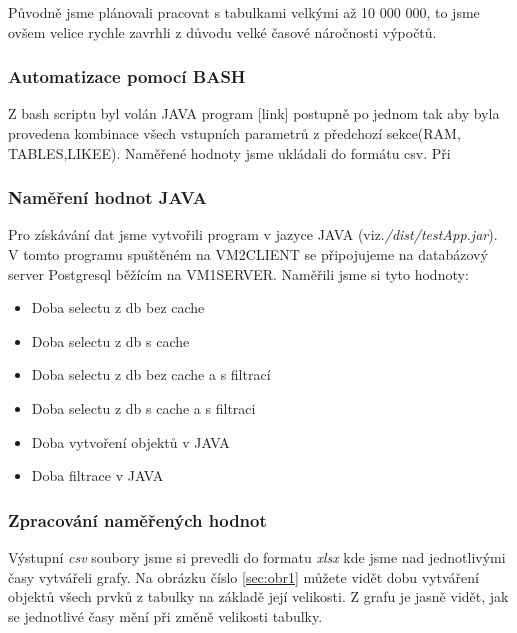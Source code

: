 \documentclass[a4paper, 11pt]{article}
\begin{document}
Původně jsme plánovali pracovat s tabulkami velkými až 10 000 000, to jsme ovšem velice rychle zavrhli z důvodu velké časové náročnosti výpočtů.

\subsubsection{Automatizace pomocí BASH}
Z bash scriptu byl volán JAVA program [link] postupně po jednom tak aby byla provedena kombinace všech vstupních parametrů z předchozí sekce(RAM, TABLES,LIKEE). Naměřené hodnoty jsme ukládali do formátu csv. Při 
\subsubsection{Naměření hodnot JAVA}
Pro získávání dat jsme vytvořili program v jazyce JAVA (viz.\textit{/dist/testApp.jar}). V tomto programu spuštěném na VM2CLIENT se připojujeme na databázový server Postgresql běžícím na VM1SERVER. Naměřili jsme si tyto hodnoty:

\begin{itemize}
\item Doba selectu z db bez cache
\item Doba selectu z db s cache
\item Doba selectu z db bez cache a s filtrací
\item Doba selectu z db s cache a s filtraci
\item Doba vytvoření objektů v JAVA
\item Doba filtrace v JAVA

\end{itemize}
 
\subsubsection{Zpracování naměřených hodnot}
Výstupní \textit{csv} soubory jsme si prevedli do formatu \textit{xlsx} kde jsme nad jednotlivými časy vytvářeli grafy. Na obrázku číslo \ref{sec:obr1} můžete vidět dobu vytváření objektů všech prvků z tabulky na základě její velikosti. Z grafu je jasně vidět, jak se jednotlivé časy mění při změně velikosti tabulky. 
\end{document}
